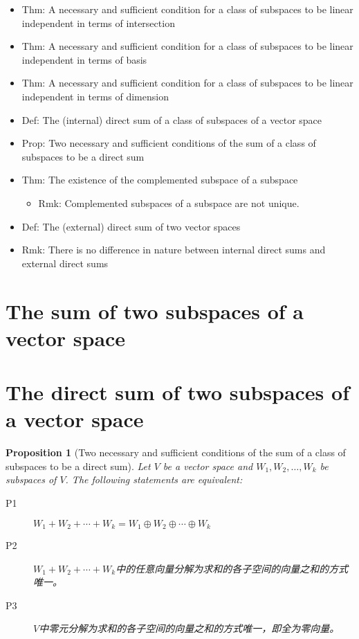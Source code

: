 \documentclass[onecolumn]{ctexart}
\newtheorem{proposition}{Proposition}
\begin{document}
\begin{itemize}
\begin{itemize}
\begin{itemize}
    \end{itemize}
    \item Thm: A necessary and sufficient condition for a class of subspaces to be linear independent in terms of intersection
    \item Thm: A necessary and sufficient condition for a class of subspaces to be linear independent in terms of basis
    \item Thm: A necessary and sufficient condition for a class of subspaces to be linear independent in terms of dimension
    \item Def: The (internal) direct sum of a class of subspaces of a vector space
    \item Prop: Two necessary and sufficient conditions of the sum of a class of subspaces to be a direct sum
    \item Thm: The existence of the complemented subspace of a subspace
    \begin{itemize}
      \item Rmk: Complemented subspaces of a subspace are not unique.
    \end{itemize}
    \item Def: The (external) direct sum of two vector spaces
    \item Rmk: There is no difference in nature between internal direct sums and external direct sums
  \end{itemize}
\end{itemize}

\section{The sum of two subspaces of a vector space}

\section{The direct sum of two subspaces of a vector space}

\begin{proposition}[Two necessary and sufficient conditions of the sum of a class of subspaces to be a direct sum]
  Let $V$ be a vector space and $W_1, W_2, \ldots, W_k$ be subspaces of $V$. The following statements are equivalent:
  \begin{description}
    \item[P1] $W_1 + W_2 + \cdots + W_k = W_1 \oplus W_2 \oplus \cdots \oplus W_k$
    \item[P2] $W_1 + W_2 + \cdots + W_k$中的任意向量分解为求和的各子空间的向量之和的方式唯一。
    \item[P3] $V$中零元分解为求和的各子空间的向量之和的方式唯一，即全为零向量。
  \end{description}
\end{proposition}
\end{document}
